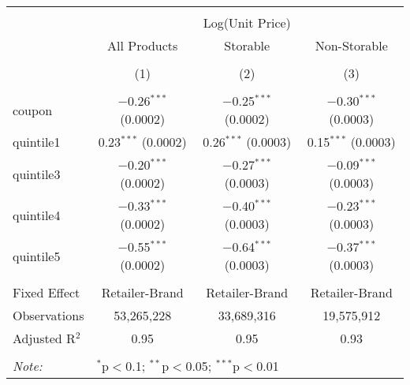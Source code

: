 
\begin{table}[!htbp] \centering 
  \caption{} 
  \label{tab:overallSavings} 
\begin{tabular}{@{\extracolsep{5pt}}lccc} 
\\[-1.8ex]\hline 
\hline \\[-1.8ex] 
 & \multicolumn{3}{c}{Log(Unit Price)} \\ 
\cline{2-4} 
 & All Products & Storable & Non-Storable \\ 
\\[-1.8ex] & (1) & (2) & (3)\\ 
\hline \\[-1.8ex] 
 coupon & $-$0.26$^{***}$ (0.0002) & $-$0.25$^{***}$ (0.0002) & $-$0.30$^{***}$ (0.0003) \\ 
  quintile1 & 0.23$^{***}$ (0.0002) & 0.26$^{***}$ (0.0003) & 0.15$^{***}$ (0.0003) \\ 
  quintile3 & $-$0.20$^{***}$ (0.0002) & $-$0.27$^{***}$ (0.0003) & $-$0.09$^{***}$ (0.0003) \\ 
  quintile4 & $-$0.33$^{***}$ (0.0002) & $-$0.40$^{***}$ (0.0003) & $-$0.23$^{***}$ (0.0003) \\ 
  quintile5 & $-$0.55$^{***}$ (0.0002) & $-$0.64$^{***}$ (0.0003) & $-$0.37$^{***}$ (0.0003) \\ 
 \hline \\[-1.8ex] 
Fixed Effect & Retailer-Brand & Retailer-Brand & Retailer-Brand \\ 
Observations & 53,265,228 & 33,689,316 & 19,575,912 \\ 
Adjusted R$^{2}$ & 0.95 & 0.95 & 0.93 \\ 
\hline 
\hline \\[-1.8ex] 
\textit{Note:}  & \multicolumn{3}{l}{$^{*}$p$<$0.1; $^{**}$p$<$0.05; $^{***}$p$<$0.01} \\ 
\end{tabular} 
\end{table} 

